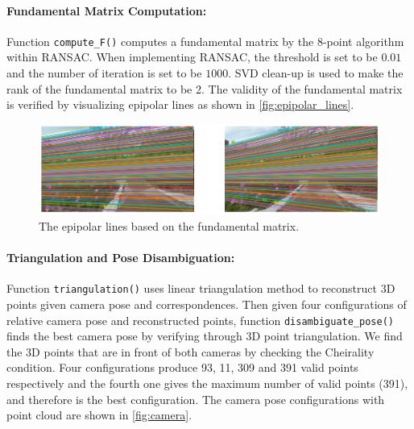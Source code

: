 \documentclass[11pt]{scrartcl}
\begin{document}
\paragraph{Fundamental Matrix Computation:} 
Function \texttt{compute\_F()} computes a fundamental matrix by the 8-point algorithm within RANSAC. When implementing RANSAC, the threshold is set to be $0.01$ and the number of iteration is set to be $1000$. SVD clean-up is used to make the rank of the fundamental matrix to be 2. The validity of the fundamental matrix is verified by visualizing epipolar lines as shown in \autoref{fig:epipolar_lines}. 

\begin{figure}[ht!]
	\begin{center}
		\includegraphics[width=0.8\linewidth]{epipolar_lines.png}
	\end{center}
	\caption{The epipolar lines based on the fundamental matrix.}
	\label{fig:epipolar_lines}
\end{figure}

\paragraph{Triangulation and Pose Disambiguation:}
Function \texttt{triangulation()} uses linear triangulation method to reconstruct 3D points given camera pose and correspondences. Then given four configurations of relative  camera pose and reconstructed points, function \texttt{disambiguate\_pose()} finds the best camera pose by verifying through 3D point triangulation. We find the 3D points that are in front of both cameras by checking the Cheirality condition. Four configurations produce 93, 11, 309 and 391 valid points respectively and the fourth one gives the maximum number of valid points (391), and therefore is the best configuration. The camera pose configurations with point cloud are shown in \autoref{fig:camera}.
\end{document}
